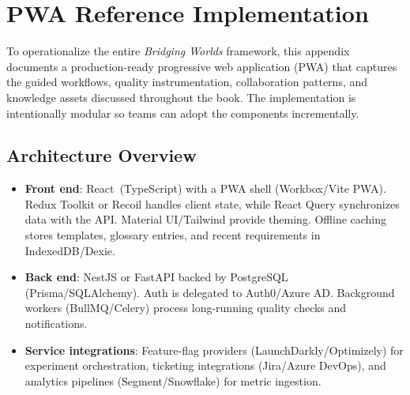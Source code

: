 \chapter{PWA Reference Implementation}
\label{appendix:pwa}


To operationalize the entire \textit{Bridging Worlds} framework, this appendix documents a production-ready progressive web application (PWA) that captures the guided workflows, quality instrumentation, collaboration patterns, and knowledge assets discussed throughout the book. The implementation is intentionally modular so teams can adopt the components incrementally.

\section{Architecture Overview}
\begin{itemize}
    \item \textbf{Front end}: React~(TypeScript) with a PWA shell (Workbox/Vite PWA). Redux Toolkit or Recoil handles client state, while React Query synchronizes data with the API. Material UI/Tailwind provide theming. Offline caching stores templates, glossary entries, and recent requirements in IndexedDB/Dexie.
    \item \textbf{Back end}: NestJS or FastAPI backed by PostgreSQL (Prisma/SQLAlchemy). Auth is delegated to Auth0/Azure AD. Background workers (BullMQ/Celery) process long-running quality checks and notifications.
    \item \textbf{Service integrations}: Feature-flag providers (LaunchDarkly/Optimizely) for experiment orchestration, ticketing integrations (Jira/Azure DevOps), and analytics pipelines (Segment/Snowflake) for metric ingestion.
\end{itemize}

